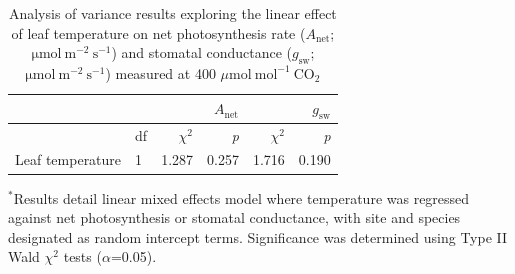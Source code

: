     \newpage
    \begin{table}[]
        \caption[Analysis of variance results exploring the linear effect of leaf temperature on net photosynthesis rate and stomatal conductance measured at 400 $\mu \mathrm{mol\ mol^{-1}\ CO_2}$]{Analysis of variance results exploring the linear effect of leaf temperature on net photosynthesis rate ($A_\mathrm{net}$; $\mathrm{\mu mol\ m^{-2}\ s^{-1}}$) and stomatal conductance ($g_\mathrm{sw}$; $\mathrm{\mu mol\ m^{-2}\ s^{-1}}$) measured at 400 $\mu \mathrm{mol\ mol^{-1}\ CO_2}$}
        \centering
        \label{table:tab.b2}
        \begin{tabular}{p{4cm}p{0.5cm}p{3cm}p{}p{3cm}p{3cm}}
            && \multicolumn{2}{r}{$A_\mathrm{net}$} & \multicolumn{2}{r}{$g_\mathrm{sw}$} \\
            \hline
            & df                    
            & \multicolumn{1}{r}{$\chi^2$}      & \multicolumn{1}{r}{\textit{p}}
            & \multicolumn{1}{r}{$\chi^2$}      & \multicolumn{1}{r}{\textit{p}}
            \\
            \hline
            
            Leaf temperature & 1    
            & \multicolumn{1}{r}{1.287}         & \multicolumn{1}{r}{0.257}      
            & \multicolumn{1}{r}{1.716}         & \multicolumn{1}{r}{0.190} \\

\end{tabular}%
\end{table}
\begin{singlespace}
\noindent $^*$Results detail linear mixed effects model where temperature was regressed against net photosynthesis or stomatal conductance, with site and species designated as random intercept terms. Significance was determined using Type II Wald $\chi^2$ tests ($\alpha$=0.05).
\end{singlespace}
\clearpage

